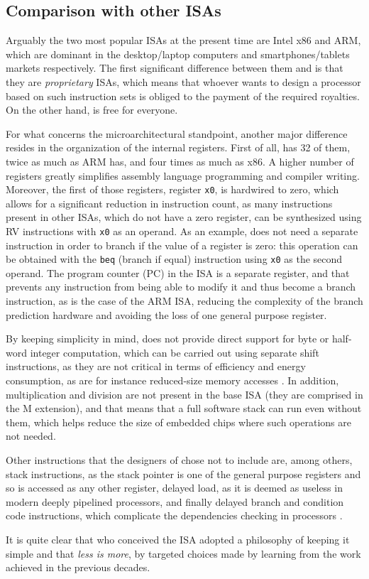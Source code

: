 \subsection{Comparison with other ISAs}\label{sec:isas}
Arguably the two most popular ISAs at the present time are Intel x86 and ARM, which are dominant in the desktop/laptop computers and smartphones/tablets markets respectively. The first significant difference between them and \riscv is that they are \emph{proprietary} ISAs, which means that whoever wants to design a processor based on such instruction sets is obliged to the payment of the required royalties. On the other hand, \riscv is free for everyone.

For what concerns the microarchitectural standpoint, another major difference resides in the organization of the internal registers. First of all, \riscv has 32 of them, twice as much as ARM has, and four times as much as x86. A higher number of registers greatly simplifies assembly language programming and compiler writing. Moreover, the first of those registers, register \texttt{x0}, is hardwired to zero, which allows for a significant reduction in instruction count, as many instructions present in other ISAs, which do not have a zero register, can be synthesized using RV instructions with \texttt{x0} as an operand. As an example, \riscv does not need a separate instruction in order to branch if the value of a register is zero: this operation can be obtained with the \texttt{beq} (branch if equal) instruction using \texttt{x0} as the second operand. The program counter (PC) in the \riscv ISA is a separate register, and that prevents any instruction from being able to modify it and thus become a branch instruction, as is the case of the ARM ISA, reducing the complexity of the branch prediction hardware and avoiding the loss of one general purpose register.

By keeping simplicity in mind, \riscv does not provide direct support for byte or half-word integer computation, which can be carried out using separate shift instructions, as they are not critical in terms of efficiency and energy consumption, as are for instance reduced-size memory accesses \cite[p.~20]{reader}. In addition, multiplication and division are not present in the base ISA (they are comprised in the M extension), and that means that a full software stack can run even without them, which helps reduce the size of embedded chips where such operations are not needed.

Other instructions that the designers of \riscv chose not to include are, among others, stack instructions, as the stack pointer is one of the general purpose registers and so is accessed as any other register, delayed load, as it is deemed as useless in modern deeply pipelined processors, and finally delayed branch and condition code instructions, which complicate the dependencies checking in \ooo processors \cite[p.~21]{reader}.

It is quite clear that who conceived the \riscv ISA adopted a philosophy of keeping it simple and that \emph{less is more}, by targeted choices made by learning from the work achieved in the previous decades.